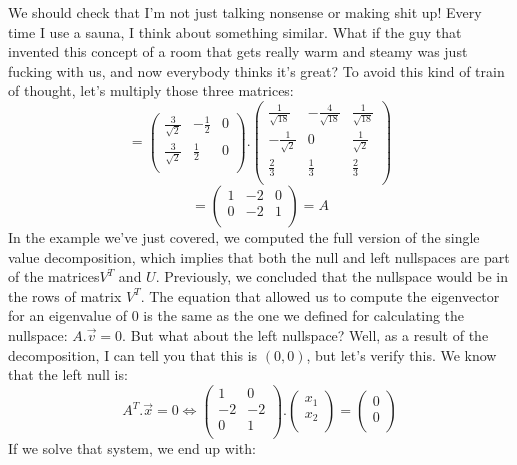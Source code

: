 \documentclass[a4,12pt,twosided,openany]{memoir}
\begin{document}
We should check that I’m not just talking nonsense or making shit up! Every time I use a sauna, I think about something similar. What if the guy that invented this concept of a room that gets really warm and steamy was just fucking with us, and now everybody thinks it’s great? To avoid this kind of train of thought, let’s multiply those three matrices:
\[= \begin{pmatrix}
\frac{3}{\sqrt{2}} & -\frac{1}{2} & 0 \\
\frac{3}{\sqrt{2}} & \frac{1}{2} & 0 \\
\end{pmatrix}.
\begin{pmatrix}
\frac{1}{\sqrt{18}} &-\frac{4}{\sqrt{18}} & \frac{1}{\sqrt{18}}\\
 -\frac{1}{\sqrt{2}}   & 0 & \frac{1}{\sqrt{2}} \\
 \frac{2}{3} &\frac{1}{3} & \frac{2}{3}\\
\end{pmatrix}
\]
\[= \begin{pmatrix}
1 & -2 & 0\\
0 & -2 & 1 \\
\end{pmatrix} = A
\]
In the example we’ve just covered, we computed the full version of the single value decomposition, which implies that both the null and left nullspaces are part of the matrices$V^T$ and $U$. Previously, we concluded that the nullspace would be in the rows of matrix $V^T$. The equation that allowed us to compute the eigenvector for an eigenvalue of 0 is the same as the one we defined for calculating the nullspace: $A.\overrightarrow{v} = 0$. But what about the left nullspace? Well, as a result of the decomposition, I can tell you that this is $(0,0)$, but let’s verify this. We know that the left null is:
\[A^T.\overrightarrow{x} = 0 \Leftrightarrow \begin{pmatrix}
1 & 0 \\
-2 & -2 \\
0 & 1 \\
\end{pmatrix}. \begin{pmatrix}
x_1\\
x_2\\
\end{pmatrix} =
\begin{pmatrix}
0\\
0\\
\end{pmatrix}
\]
If we solve that system, we end up with:
\end{document}
